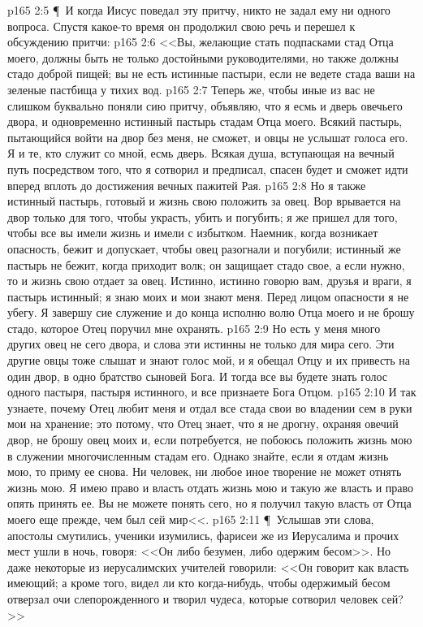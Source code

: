 \vs p165 2:5 \P\ И когда Иисус поведал эту притчу, никто не задал ему ни одного вопроса. Спустя какое\hyp{}то время он продолжил свою речь и перешел к обсуждению притчи:
\vs p165 2:6 <<Вы, желающие стать подпасками стад Отца моего, должны быть не только достойными руководителями, но также должны  стадо доброй пищей; вы не есть истинные пастыри, если не ведете стада ваши на зеленые пастбища у тихих вод.
\vs p165 2:7 Теперь же, чтобы иные из вас не слишком буквально поняли сию притчу, объявляю, что я есмь и дверь овечьего двора, и одновременно истинный пастырь стадам Отца моего. Всякий пастырь, пытающийся войти на двор без меня, не сможет, и овцы не услышат голоса его. Я и те, кто служит со мной, есмь дверь. Всякая душа, вступающая на вечный путь посредством того, что я сотворил и предписал, спасен будет и сможет идти вперед вплоть до достижения вечных пажитей Рая.
\vs p165 2:8 Но я также истинный пастырь, готовый и жизнь свою положить за овец. Вор врывается на двор только для того, чтобы украсть, убить и погубить; я же пришел для того, чтобы все вы имели жизнь и имели с избытком. Наемник, когда возникает опасность, бежит и допускает, чтобы овец разогнали и погубили; истинный же пастырь не бежит, когда приходит волк; он защищает стадо свое, а если нужно, то и жизнь свою отдает за овец. Истинно, истинно говорю вам, друзья и враги, я пастырь истинный; я знаю моих и мои знают меня. Перед лицом опасности я не убегу. Я завершу сие служение и до конца исполню волю Отца моего и не брошу стадо, которое Отец поручил мне охранять.
\vs p165 2:9 Но есть у меня много других овец не сего двора, и слова эти истинны не только для мира сего. Эти другие овцы тоже слышат и знают голос мой, и я обещал Отцу и их привесть на один двор, в одно братство сыновей Бога. И тогда все вы будете знать голос одного пастыря, пастыря истинного, и все признаете Бога Отцом.
\vs p165 2:10 И так узнаете, почему Отец любит меня и отдал все стада свои во владении сем в руки мои на хранение; это потому, что Отец знает, что я не дрогну, охраняя овечий двор, не брошу овец моих и, если потребуется, не побоюсь положить жизнь мою в служении многочисленным стадам его. Однако знайте, если я отдам жизнь мою, то приму ее снова. Ни человек, ни любое иное творение не может отнять жизнь мою. Я имею право и власть отдать жизнь мою и такую же власть и право опять принять ее. Вы не можете понять сего, но я получил такую власть от Отца моего еще прежде, чем был сей мир<<.
\vs p165 2:11 \P\ Услышав эти слова, апостолы смутились, ученики изумились, фарисеи же из Иерусалима и прочих мест ушли в ночь, говоря: <<Он либо безумен, либо одержим бесом>>. Но даже некоторые из иерусалимских учителей говорили: <<Он говорит как власть имеющий; а кроме того, видел ли кто когда\hyp{}нибудь, чтобы одержимый бесом отверзал очи слепорожденного и творил чудеса, которые сотворил человек сей?>>
